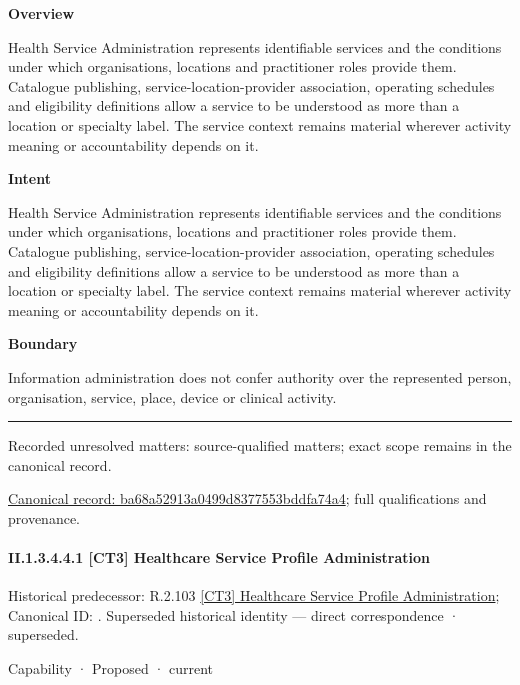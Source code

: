 \textbf{Overview}



Health Service Administration represents identifiable services and the conditions under which organisations, locations and practitioner roles provide them. Catalogue publishing, service-location-provider association, operating schedules and eligibility definitions allow a service to be understood as more than a location or specialty label. The service context remains material wherever activity meaning or accountability depends on it.



\textbf{Intent}



Health Service Administration represents identifiable services and the conditions under which organisations, locations and practitioner roles provide them. Catalogue publishing, service-location-provider association, operating schedules and eligibility definitions allow a service to be understood as more than a location or specialty label. The service context remains material wherever activity meaning or accountability depends on it.



\textbf{Boundary}



Information administration does not confer authority over the represented person, organisation, service, place, device or clinical activity.



\medskip\hrule\medskip

{\small Recorded unresolved matters: source-qualified matters; exact scope remains in the canonical record.}\par
{\footnotesize \href{../../../../../../../continuum/strategy/capability/ba68a52913a0499d8377553bddfa74a4.md}{Canonical record: ba68a52913a0499d8377553bddfa74a4}; full qualifications and provenance.}\par
\paragraph*{II.1.3.4.4.1 [CT3] Healthcare Service Profile Administration}
\label{navigation:II.1.3.4.4.1}

{\small Historical predecessor: R.2.103 \hyperref[element:7780ca2fed2346439d5f559d00cc4ee4]{[CT3] Healthcare Service Profile Administration}; Canonical ID: \texttt{}. Superseded historical identity — direct correspondence · superseded.}\par
\label{element:e75d5eb30936476ea7a9cbadfa43d5ef}
{\small Capability · Proposed · current}\par

